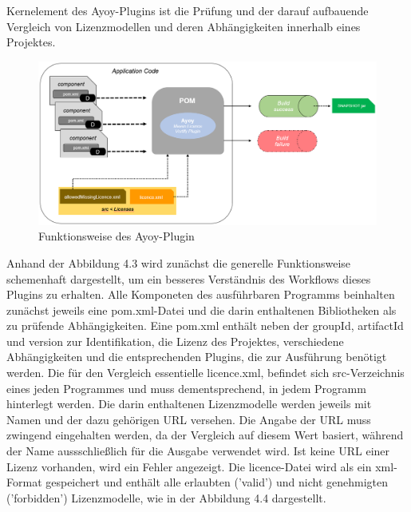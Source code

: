 Kernelement des Ayoy-Plugins ist die Prüfung und der darauf aufbauende Vergleich von Lizenzmodellen und deren Abhängigkeiten innerhalb eines Projektes.

\begin{figure}[h]
    \centering
    \includegraphics[scale=0.4]{Bilder/Ayoy-Plugin.png}
    \caption{Funktionsweise des Ayoy-Plugin}
\end{figure}

Anhand der Abbildung 4.3 wird zunächst die generelle Funktionsweise schemenhaft dargestellt, um ein besseres Verständnis des Workflows dieses Plugins zu erhalten. Alle Komponeten des ausführbaren Programms beinhalten zunächst jeweils eine pom.xml-Datei und die darin enthaltenen Bibliotheken als zu prüfende Abhängigkeiten. Eine pom.xml enthält neben der groupId, artifactId und version zur Identifikation, die Lizenz des Projektes, verschiedene Abhängigkeiten und die entsprechenden Plugins, die zur Ausführung benötigt werden. Die für den Vergleich essentielle licence.xml, befindet sich src-Verzeichnis eines jeden Programmes und muss dementsprechend, in jedem Programm hinterlegt werden. Die darin enthaltenen Lizenzmodelle werden jeweils mit Namen und der dazu gehörigen URL versehen. Die Angabe der URL muss zwingend eingehalten werden, da der Vergleich auf diesem Wert basiert, während der Name aussschließlich für die Ausgabe verwendet wird. Ist keine URL einer Lizenz vorhanden, wird ein Fehler angezeigt. Die licence-Datei wird als ein xml-Format gespeichert und enthält alle erlaubten ('valid') und nicht genehmigten ('forbidden') Lizenzmodelle, wie in der Abbildung 4.4 dargestellt. 

